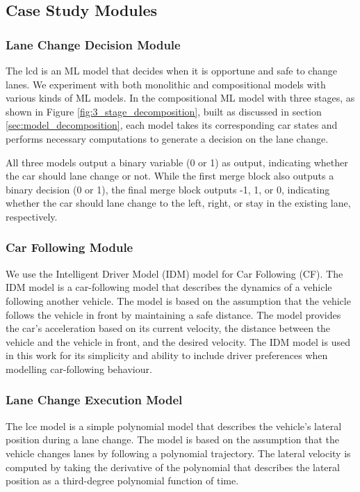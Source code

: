 \subsection{Case Study Modules}
\subsubsection{Lane Change Decision Module}
\label{sec:lcd_module}
The \gls{lcd} is an ML model that decides when it is opportune and safe to change lanes. We experiment with both monolithic and compositional models with various kinds of ML models. In the compositional ML model with three stages, as shown in Figure \ref{fig:3_stage_decomposition}, built as discussed in section \ref{sec:model_decomposition}, each model takes its corresponding car states and performs necessary computations to generate a decision on the lane change. 

All three models output a binary variable (0 or 1) as output, indicating whether the car should lane change or not. While the first merge block also outputs a binary decision (0 or 1), the final merge block outputs -1, 1, or 0, indicating whether the car should lane change to the left, right, or stay in the existing lane, respectively. 


\subsubsection{Car Following Module}
\label{sec:cf_module}
We use the Intelligent Driver Model (IDM) model \cite{treiber1999,PhysRevE.62.1805} for Car Following (CF). The IDM model is a car-following model that describes the dynamics of a vehicle following another vehicle. The model is based on the assumption that the vehicle follows the vehicle in front by maintaining a safe distance. The model provides the car's acceleration based on its current velocity, the distance between the vehicle and the vehicle in front, and the desired velocity. The IDM model is used in this work for its simplicity and ability to include driver preferences when modelling car-following behaviour. 

\subsubsection{Lane Change Execution Model}
\label{sec:lce_module}
The \gls{lce} model is a simple polynomial model that describes the vehicle's lateral position during a lane change. The model is based on the assumption that the vehicle changes lanes by following a polynomial trajectory. The lateral velocity is computed by taking the derivative of the polynomial that describes the lateral position as a third-degree polynomial function of time. 

